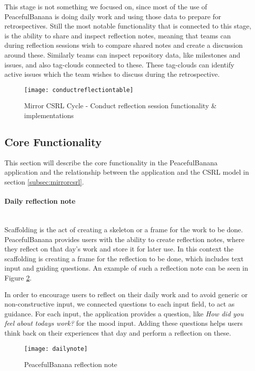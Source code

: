 This stage is not something we focused on, since most of the use of PeacefulBanana is doing daily work and using those data to prepare for retrospectives. Still the most notable functionality that is connected to this stage, is the ability to share and inspect reflection notes, meaning that teams can during reflection sessions wish to compare shared notes and create a discussion around these. Similarly teams can inspect repository data, like milestones and issues, and also tag-clouds connected to these. These tag-clouds can identify active issues which the team wishes to discuss during the retrospective. 
\begin{figure}[H]
\centering
    \texttt{[image: conductreflectiontable]}
\caption{Mirror CSRL Cycle - Conduct reflection session functionality \& implementations}
\label{conductreflectiontable}
\end{figure}

\subsection{Core Functionality}
This section will describe the core functionality in the PeacefulBanana application and the relationship between the application and the CSRL model in section \ref{subsec:mirrorcsrl}. 
\paragraph{Daily reflection note}\mbox{}\\
Scaffolding is the act of creating a skeleton or a frame for the work to be done.
PeacefulBanana provides users with the ability to create reflection notes, where they reflect on that day's work and store it for later use. In this context the scaffolding is creating a frame for the reflection to be done, which includes text input and guiding questions. An example of such a reflection note can be seen in Figure \ref{dailynotefunc}. 

In order to encourage users to reflect on their daily work and to avoid generic or non-constructive input, we connected questions to each input field, to act as guidance. For each input, the application provides a question, like \emph{How did you feel about todays work?} for the mood input. Adding these questions helps users think back on their experiences that day and perform a reflection on these. 
\begin{figure}[H]
    \centering
        \texttt{[image: dailynote]}
    \caption{PeacefulBanana reflection note}
    \label{dailynotefunc}
\end{figure}

